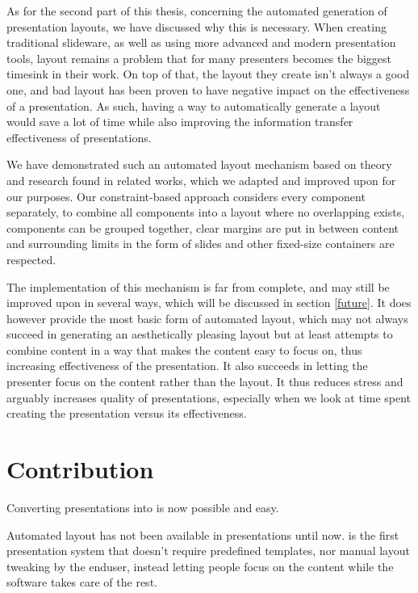   As for the second part of this thesis, concerning the automated generation of
  presentation layouts, we have discussed why this is necessary. When creating
  traditional slideware, as well as using more advanced and modern presentation
  tools, layout remains a problem that for many presenters becomes the biggest
  timesink in their work. On top of that, the layout they create isn't always a
  good one, and bad layout has been proven to have negative impact on the
  effectiveness of a presentation. As such, having a way to automatically
  generate a layout would save a lot of time while also improving the
  information transfer effectiveness of presentations.

  We have demonstrated such an automated layout mechanism based on theory and
  research found in related works, which we adapted and improved upon for our
  purposes. Our constraint-based approach considers every component separately,
  to combine all components into a layout where no overlapping exists,
  components can be grouped together, clear margins are put in between content
  and surrounding limits in the form of slides and other fixed-size containers
  are respected.

  The implementation of this mechanism is far from complete, and may still be
  improved upon in several ways, which will be discussed in section
  \ref{future}. It does however provide the most basic form of automated
  layout, which may not always succeed in generating an aesthetically pleasing
  layout but at least attempts to combine content in a way that makes the
  content easy to focus on, thus increasing effectiveness of the presentation.
  It also succeeds in letting the presenter focus on the content rather than
  the layout. It thus reduces stress and arguably increases quality of
  presentations, especially when we look at time spent creating the
  presentation versus its effectiveness.

  \section{Contribution}


   Converting \ppt presentations into \mxp is now possible and easy.

   Automated layout has not been available in presentations until now. \mxp is
   the first presentation system that doesn't require predefined templates, nor
   manual layout tweaking by the enduser, instead letting people focus on the
   content while the software takes care of the rest.

